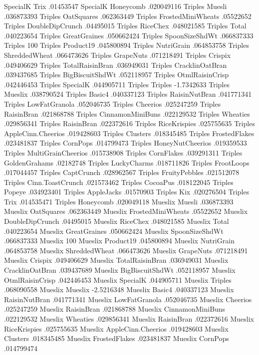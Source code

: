 SpecialK	Trix	.01453547
SpecialK	Honeycomb	.020049116
Triples	Muesli	.036873393
Triples	OatSquares	.062363449
Triples	FrostedMiniWheats	.05522652
Triples	DoubleDipCrunch	.04495015
Triples	RiceChex	.048021585
Triples	Total	.040223654
Triples	GreatGraines	.050662424
Triples	SpoonSizeShdWt	.066837333
Triples	100%
Triples	Product19	.045800894
Triples	NutriGrain	.064853758
Triples	ShreddedWheat	.066473626
Triples	GrapeNuts	.071218491
Triples	Crispix	.049406629
Triples	TotalRaisinBran	.036949031
Triples	CracklinOatBran	.039437685
Triples	BigBiscuitShdWt	.052118957
Triples	OtmlRaisinCrisp	.042446453
Triples	SpecialK	.044905711
Triples	Triples	-1.7342633
Triples	Mueslix	.038790524
Triples	Basic4	.040337123
Triples	RaisinNutBran	.041771341
Triples	LowFatGranola	.052046735
Triples	Cheerios	.025247259
Triples	RaisinBran	.021868788
Triples	CinnamonMiniBuns	.022129532
Triples	Wheaties	.029856341
Triples	RaisinBran	.022372616
Triples	RiceKrispies	.025755635
Triples	AppleCinn.Cheerios	.019428603
Triples	Clusters	.018345485
Triples	FrostedFlakes	.023481837
Triples	CornPops	.014799473
Triples	HoneyNutCheerios	.019359533
Triples	MultiGrainCheerios	.015738908
Triples	CornFlakes	.039291311
Triples	GoldenGrahams	.02182748
Triples	LuckyCharms	.018711826
Triples	FrootLoops	.017044457
Triples	CaptCrunch	.028962567
Triples	FruityPebbles	.021512078
Triples	Cinn.ToastCrunch	.021573462
Triples	CocoaPus	.018122045
Triples	Popeye	.034923401
Triples	AppleJacks	.01570903
Triples	Kix	.020276504
Triples	Trix	.014535471
Triples	Honeycomb	.020049118
Mueslix	Muesli	.036873393
Mueslix	OatSquares	.062363449
Mueslix	FrostedMiniWheats	.05522652
Mueslix	DoubleDipCrunch	.04495015
Mueslix	RiceChex	.048021585
Mueslix	Total	.040223654
Mueslix	GreatGraines	.050662424
Mueslix	SpoonSizeShdWt	.066837333
Mueslix	100%
Mueslix	Product19	.045800894
Mueslix	NutriGrain	.064853758
Mueslix	ShreddedWheat	.066473626
Mueslix	GrapeNuts	.071218491
Mueslix	Crispix	.049406629
Mueslix	TotalRaisinBran	.036949031
Mueslix	CracklinOatBran	.039437689
Mueslix	BigBiscuitShdWt	.052118957
Mueslix	OtmlRaisinCrisp	.042446453
Mueslix	SpecialK	.044905711
Mueslix	Triples	.068090558
Mueslix	Mueslix	-2.5216348
Mueslix	Basic4	.040337123
Mueslix	RaisinNutBran	.041771341
Mueslix	LowFatGranola	.052046735
Mueslix	Cheerios	.025247259
Mueslix	RaisinBran	.021868788
Mueslix	CinnamonMiniBuns	.022129532
Mueslix	Wheaties	.029856341
Mueslix	RaisinBran	.022372616
Mueslix	RiceKrispies	.025755635
Mueslix	AppleCinn.Cheerios	.019428603
Mueslix	Clusters	.018345485
Mueslix	FrostedFlakes	.023481837
Mueslix	CornPops	.014799474
